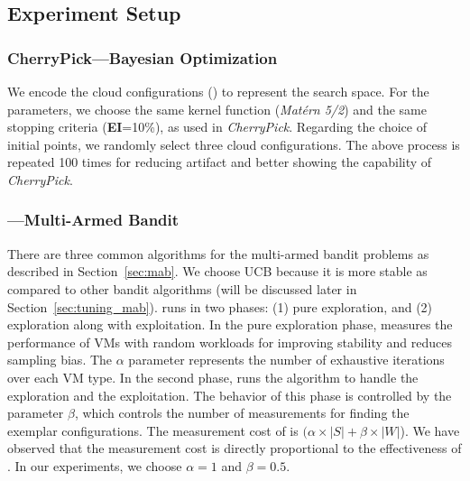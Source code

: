 \subsection{Experiment Setup}
\label{sec:setup}


\subsubsection*{CherryPick---Bayesian Optimization}

We encode the cloud configurations () to represent the search space.
For the parameters, we choose the same kernel function (\emph{Mat\'ern 5/2}) and
the same stopping criteria (\textbf{EI}=10\%), as used in \emph{CherryPick}.
Regarding the choice of initial points, we randomly select three cloud configurations.
The above process is repeated 100 times for reducing artifact and better showing the capability of \emph{CherryPick}.


\subsubsection*{\micky---Multi-Armed Bandit}
There are three common algorithms for the multi-armed bandit problems as described in Section~\ref{sec:mab}.
We choose UCB because it is more stable as compared to other bandit algorithms
(will be discussed later in Section~\ref{sec:tuning_mab}).
\micky runs in two phases: (1) pure exploration, and (2) exploration along with exploitation.
In the pure exploration phase, \micky measures the performance of VMs with random workloads for improving stability and reduces sampling bias.
The $\alpha$  parameter represents the number of exhaustive iterations over each VM type.
In the second phase, \micky runs the algorithm to handle the exploration and the exploitation.
The behavior of this phase is controlled by the parameter $\beta$, which controls the number of measurements for finding the exemplar configurations.
The measurement cost of \micky is $(\alpha \times \mathit{|S|} + \beta \times \mathit{|W|}$).
We have observed that the measurement cost is directly proportional to the effectiveness of \micky.
In our experiments, we choose $\alpha=1$ and $\beta=0.5$.



